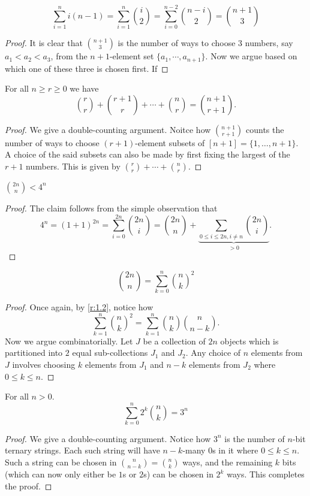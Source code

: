\begin{claim}
\[
\sum_{i=1}^{n}i(n-1) = \sum_{i=1}^{n}\binom{i}{2} = \sum_{i=0}^{n-2}\binom{n-i}{2} = \binom{n+1}{3} 
\]
\end{claim}
\begin{proof}
It is clear that $\binom{n+1}{3}$ is the number of ways to choose $3$ numbers, say $a_{1}<a_{2}<a_{3}$, from the $n+1$-element set $\{a_1,\cdots,a_{n+1}\}$. Now we argue based on which one of these three is chosen first. If 
\end{proof}
\begin{claim}
For all $n\geq r\geq 0$ we have 
\[
\binom{r}{r}+\binom{r+1}{r}+\cdots+\binom{n}{r} = \binom{n+1}{r+1}
.\] 
\end{claim}
\begin{proof}
We give a double-counting argument. Noitce how $\binom{n+1}{r+1}$ counts the number of ways to choose $(r+1)$-element subsets of $[n+1]=\{1,\ldots,n+1\}$. A choice of the said subsets can also be made by first fixing the largest of the $r+1$ numbers. This is given by $\binom{r}{r}+\cdots+\binom{n}{r}$. 
\end{proof}
\begin{claim}
$\binom{2n}{n}<4^n$
\end{claim}
\begin{proof}
The claim follows from the simple observation that \[
4^{n} = (1+1)^{2n} = \sum_{i=0}^{2n} \binom{2n}{i} = \binom{2n}{n}+\underbrace{\sum_{0\leq i\leq 2n, i\neq n} \binom{2n}{i}}_{>0}. 
\]
\end{proof}
\begin{claim}
\[\binom{2n}{n} = \sum_{k=0}^{n} \binom{n}{k}^2\]
\end{claim}
\begin{proof}
Once again, by \cref{r:1.2}, notice how \[
\sum_{k=1}^n\binom{n}{k}^2 = \sum_{k=1}^{n}\binom{n}{k}\binom{n}{n-k}.
\] Now we argue combinatorially. Let $J$ be a collection of $2n$ objects which is partitioned into $2$ equal sub-collections $J_1$ and $J_2$. Any choice of $n$ elements from $J$ involves choosing $k$ elements from $J_1$ and $n-k$ elements from $J_2$ where $0\leq k\leq n$. 
\end{proof}
\begin{claim}
	For all $n>0$. \[
		\sum_{k=0}^{n} 2^k\binom{n}{k} = 3^n
	\]
\end{claim}
\begin{proof}
We give a double-counting argument. Notice how $3^n$ is the number of $n$-bit ternary strings. Each such string will have $n-k$-many $0$s in it where $0\leq k \leq n$. Such a string can be chosen in $\binom{n}{n-k}=\binom{n}{k}$ ways, and the remaining $k$ bits (which can now only either be $1$s or $2$s) can be chosen in $2^k$ ways. This completes the proof. 
\end{proof}
